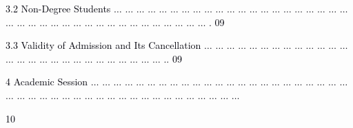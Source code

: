\documentclass[12pt]{article}
\begin{document}
\vspace{\baselineskip}
\begin{adjustwidth}{0.21in}{0.0in}
{\fontsize{7pt}{8.4pt}\selectfont \textcolor[HTML]{00000A}{3.2 Non-Degree Students $ \ldots $ $ \ldots $ $ \ldots $ $ \ldots $ $ \ldots $ $ \ldots $ $ \ldots $ $ \ldots $ $ \ldots $ $ \ldots $ $ \ldots $ $ \ldots $ $ \ldots $ $ \ldots $ $ \ldots $ $ \ldots $ $ \ldots $ $ \ldots $ $ \ldots $ $ \ldots $ $ \ldots $ $ \ldots $ $ \ldots $ $ \ldots $ $ \ldots $ $ \ldots $ $ \ldots $ $ \ldots $ $ \ldots $ $ \ldots $ $ \ldots $ $ \ldots $ $ \ldots $ $ \ldots $ $ \ldots $ $ \ldots $ $ \ldots $ $ \ldots $ $ \ldots $ . 09}\par}\par

\end{adjustwidth}


\vspace{\baselineskip}
\begin{adjustwidth}{0.21in}{0.0in}
{\fontsize{7pt}{8.4pt}\selectfont \textcolor[HTML]{00000A}{3.3 Validity of Admission and Its Cancellation $ \ldots $ $ \ldots $ $ \ldots $ $ \ldots $ $ \ldots $ $ \ldots $ $ \ldots $ $ \ldots $ $ \ldots $ $ \ldots $ $ \ldots $ $ \ldots $ $ \ldots $ $ \ldots $ $ \ldots $ $ \ldots $ $ \ldots $ $ \ldots $ $ \ldots $ $ \ldots $ $ \ldots $ $ \ldots $ $ \ldots $ $ \ldots $ $ \ldots $ $ \ldots $ $ \ldots $ .. 09}\par}\par

\end{adjustwidth}


\vspace{\baselineskip}
{\fontsize{7pt}{8.4pt}\selectfont \textcolor[HTML]{00000A}{4 Academic Session $ \ldots $ $ \ldots $ $ \ldots $ $ \ldots $ $ \ldots $ $ \ldots $ $ \ldots $ $ \ldots $ $ \ldots $ $ \ldots $ $ \ldots $ $ \ldots $ $ \ldots $ $ \ldots $ $ \ldots $ $ \ldots $ $ \ldots $ $ \ldots $ $ \ldots $ $ \ldots $ $ \ldots $ $ \ldots $ $ \ldots $ $ \ldots $ $ \ldots $ $ \ldots $ $ \ldots $ $ \ldots $ $ \ldots $ $ \ldots $ $ \ldots $ $ \ldots $ $ \ldots $ $ \ldots $ $ \ldots $ $ \ldots $ $ \ldots $ $ \ldots $ $ \ldots $ $ \ldots $ $ \ldots $ $ \ldots $ $ \ldots $ $ \ldots $  \tabto{5.49in} }{\fontsize{8pt}{9.6pt}\selectfont \textcolor[HTML]{00000A}{10}\par}\par}\par
\end{document}
